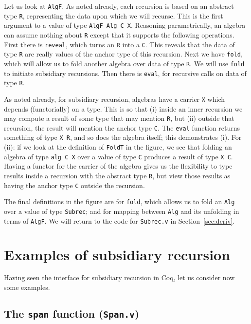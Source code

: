 \documentclass[a4paper,USenglish]{lipics-v2021}
\begin{document}
Let us look at \verb|AlgF|.  As noted already, each recursion is based
on an abstract type \verb|R|, representing the data upon which we will
recurse.  This is the first argument to a value of type
\verb|AlgF Alg C X|.  Reasoning parametrically, an algebra can assume
nothing about \verb|R| except that it supports the following
operations.  First there is \verb|reveal|, which turns an \verb|R|
into a \verb|C|.  This reveals that the data of type \verb|R| are
really values of the anchor type of this recursion.  Next we have
\texttt{fold}, which will allow us to fold another algebra over data
of type \verb|R|.  We will use \verb|fold| to initiate subsidiary
recursions.  Then there is \verb|eval|, for recursive calls on data of
type \verb|R|.

As noted already, for subsidiary recursion, algebras have a carrier
\verb|X| which depends (functorially) on a type.  This is so that (i)
inside an inner recursion we may compute a result of some type that
may mention \verb|R|, but (ii) outside that recursion, the result will
mention the anchor type \verb|C|.  The \verb|eval| function returns
something of type \verb|X R|, and so does the algebra itself; this
demonstrates (i).  For (ii): if we look at the definition of
\verb|FoldT| in the figure, we see that folding an algebra of type
\verb|alg C X| over a value of type \verb|C| produces a result of type
\verb|X C|.  Having a functor for the carrier of the algebra gives us
the flexibility to type results inside a recursion with the abstract
type \verb|R|, but view those results as having the anchor type
\verb|C| outside the recursion.

The final definitions in the figure are for \verb|fold|, which allows
us to fold an \verb|Alg| over a value of type \verb|Subrec|; and for mapping
between \verb|Alg| and its unfolding in terms of \verb|AlgF|.  We will
return to the code for \verb|Subrec.v| in Section~\ref{sec:deriv}.

\section{Examples of subsidiary recursion}
\label{sec:examples}

Having seen the interface for subsidiary recursion in Coq, let us
consider now some examples.

\subsection{The \texttt{span} function (\texttt{Span.v})}
\end{document}
